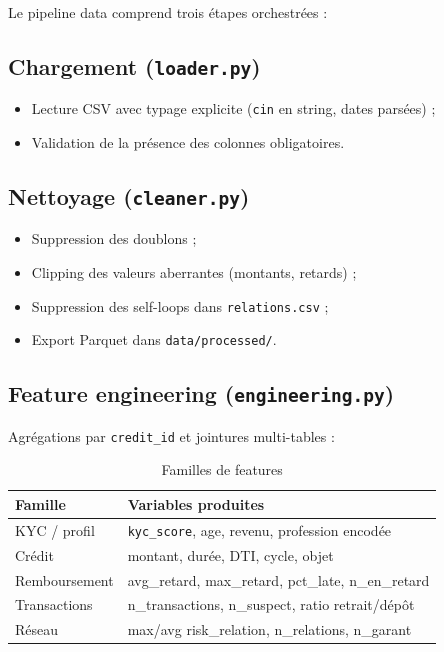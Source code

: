 Le pipeline data comprend trois étapes orchestrées :

\subsection{Chargement (\texttt{loader.py})}

\begin{itemize}[leftmargin=*]
  \item Lecture CSV avec typage explicite (\texttt{cin} en string, dates parsées) ;
  \item Validation de la présence des colonnes obligatoires.
\end{itemize}

\subsection{Nettoyage (\texttt{cleaner.py})}

\begin{itemize}[leftmargin=*]
  \item Suppression des doublons ;
  \item Clipping des valeurs aberrantes (montants, retards) ;
  \item Suppression des self-loops dans \texttt{relations.csv} ;
  \item Export Parquet dans \texttt{data/processed/}.
\end{itemize}

\subsection{Feature engineering (\texttt{engineering.py})}

Agrégations par \texttt{credit\_id} et jointures multi-tables :

\begin{table}[H]
  \centering
  \caption{Familles de features}
  \small
  \begin{tabular}{|l|p{9cm}|}
    \hline
    \textbf{Famille} & \textbf{Variables produites} \\
    \hline
    KYC / profil & \texttt{kyc\_score}, age, revenu, profession encodée \\
    \hline
    Crédit & montant, durée, DTI, cycle, objet \\
    \hline
    Remboursement & avg\_retard, max\_retard, pct\_late, n\_en\_retard \\
    \hline
    Transactions & n\_transactions, n\_suspect, ratio retrait/dépôt \\
    \hline
    Réseau & max/avg risk\_relation, n\_relations, n\_garant \\
    \hline
  \end{tabular}
\end{table}

